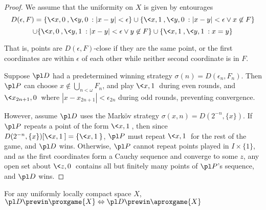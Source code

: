 \begin{proof}
  We assume that the uniformity on $X$ is given by entourages 
  \[
    D(\epsilon,F) = 
    \{\<x,0\>,\<y,0\>: |x-y|<\epsilon \}
      \cup
    \{\<x,1\>,\<y,0\>: |x-y|<\epsilon \vee x\not\in F\}
  \]
  \[
      \cup
    \{\<x,0\>,\<y,1\>: |x-y|<\epsilon \vee y\not\in F\}
      \cup
    \{\<x,1\>,\<y,1\>: x=y\}
  \]

  That is, points are $D(\epsilon,F)$-close if they are the same point, or 
  the first coordinates are within $\epsilon$ of each other while neither 
  second coordinate is in $F$.

  Suppose $\pl D$ had a predetermined winning strategy 
  $\sigma(n)=D(\epsilon_n,F_n)$. Then 
  $\pl P$ can choose $x\not\in \bigcup_{n<\omega} F_n$, and play $\<x,1\>$ 
  during even rounds, and $\<x_{2n+1},0\>$ where $|x-x_{2n+1}|<\epsilon_{2n}$
  during odd rounds, preventing convergence.

  However, assume $\pl D$ uses the Mark\"ov strategy 
  $\sigma(x,n)=D(2^{-n},\{x\})$.
  If $\pl P$ repeats a point of the form $\<x,1\>$, then since 
  $D(2^{-n},\{x\})[\<x,1\>]=\{\<x,1\>\}$, $\pl P$ must repeat $\<x,1\>$ for
  the rest of the game, and $\pl D$ wins. Otherwise, $\pl P$ cannot repeat 
  points played in $I\times\{1\}$, and as the first
  coordinates form a Cauchy sequence and converge to some $z$, any open set
  about $\<z,0\>$ contains all but finitely many points of $\pl P$'s sequence,
  and $\pl D$ wins.
\end{proof}

\begin{thm}
  For any uniformly locally compact space $X$,
      $\pl D\prewin \proxgame{X} \Leftrightarrow \pl D\prewin \aproxgame{X}$
\end{thm}

